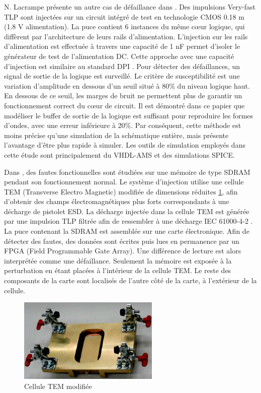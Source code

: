 N. Lacrampe présente un autre cas de défaillance dans \cite{LacrampeTransientImmunity}.
Des impulsions Very-fast TLP sont injectées sur un circuit intégré de test en technologie CMOS 0.18 \textmu{}m (1.8 V alimentation).
La puce contient 6 instances du même cœur logique, qui diffèrent par l'architecture de leurs rails d'alimentation.
L'injection sur les rails d'alimentation est effectuée à travers une capacité de 1 nF permet d'isoler le générateur de test de l'alimentation DC.
Cette approche avec une capacité d'injection est similaire au standard DPI \cite{iec62132-4}.
Pour détecter des défaillances, un signal de sortie de la logique est surveillé.
Le critère de susceptibilité est une variation d'amplitude en dessous d'un seuil situé à 80\% du niveau logique haut.
En dessous de ce seuil, les marges de bruit ne permettent plus de garantir un fonctionnement correct du cœur de circuit.
Il est démontré dans ce papier que modéliser le buffer de sortie de la logique est suffisant pour reproduire les formes d'ondes, avec une erreur inférieure à 20\%.
Par conséquent, cette méthode est moins précise qu'une simulation de la schématique entière, mais présente l'avantage d'être plus rapide à simuler.
Les outils de simulation employés dans cette étude sont principalement du VHDL-AMS et des simulations SPICE.

Dans \cite{SDRAMCase}, des fautes fonctionnelles sont étudiées sur une mémoire de type SDRAM pendant son fonctionnement normal.
Le système d'injection utilise une cellule TEM (Transverse Electro Magnetic) modifiée de dimensions réduites \ref{fig:modified-tem-cell}, afin d'obtenir des champs électromagnétiques plus forts correspondants à une décharge de pistolet ESD.
La décharge injectée dans la cellule TEM est générée par une impulsion TLP filtrée afin de ressembler à une décharge IEC 61000-4-2 \cite{iec61000-4-2}.
La puce contenant la SDRAM est assemblée sur une carte électronique.
Afin de détecter des fautes, des données sont écrites puis lues en permanence par un FPGA (Field Programmable Gate Array).
Une différence de lecture est alors interprétée comme une défaillance.
Seulement la mémoire est exposée à la perturbation en étant placées à l'intérieur de la cellule TEM.
Le reste des composants de la carte sont localisés de l'autre côté de la carte, à l'extérieur de la cellule.

\begin{figure}[!h]
  \centering
  \includegraphics[width=0.6\textwidth]{src/1/figures/modified_tem_cell.png}
  \caption{Cellule TEM modifiée \cite{SDRAMCase}}
  \label{fig:modified-tem-cell}
\end{figure}

